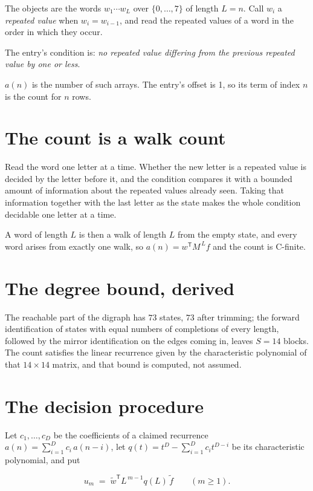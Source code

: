 \documentclass[11pt]{article}
\theoremstyle{definition}
\begin{document}
The objects are the words $w_1\cdots w_L$ over $\{0,\dots,7\}$ of length $L = n$. Call $w_i$ a {\itshape repeated value} when $w_i = w_{i-1}$, and read the repeated values of a word in the order in which they occur.

The entry's condition is: {\itshape no repeated value differing from the previous repeated value by one or less}.

$a(n)$ is the number of such arrays. The entry's offset is 1, so its term of index $n$ is the count for $n$ rows.

\section{The count is a walk count}

Read the word one letter at a time. Whether the new letter is a repeated value is decided by the letter before it, and the condition compares it with a bounded amount of information about the repeated values already seen. Taking that information together with the last letter as the state makes the whole condition decidable one letter at a time.

A word of length $L$ is then a walk of length $L$ from the empty state, and every word arises from exactly one walk, so $a(n) = w^{\mathsf T}M^{\,L}f$ and the count is C-finite.

\section{The degree bound, derived}

The reachable part of the digraph has $73$ states, $73$ after trimming; the forward identification of states with equal numbers of completions of every length, followed by the mirror identification on the edges coming in, leaves $S = 14$ blocks. The count satisfies the linear recurrence given by the characteristic polynomial of that $14\times14$ matrix, and that bound is computed, not assumed.

\section{The decision procedure}

Let $c_1,\dots,c_D$ be the coefficients of a claimed recurrence $a(n) = \sum_{i=1}^{D} c_i\,a(n-i)$, let $q(t) = t^{D} - \sum_{i=1}^{D} c_i t^{D-i}$ be its characteristic polynomial, and put

\[u_m \;=\; \tilde w^{\mathsf T} L^{\,m-1} q(L)\,\tilde f \qquad (m \ge 1).\]
\end{document}
